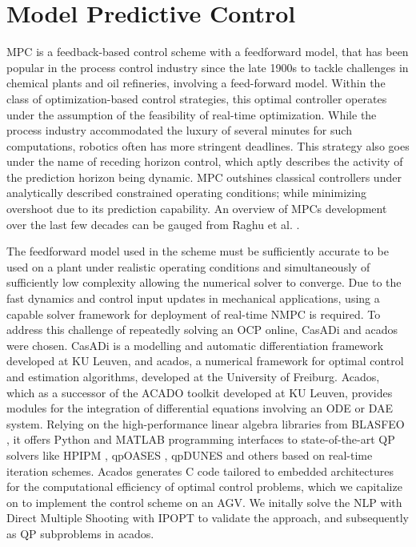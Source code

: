 \section{Model Predictive Control}\label{sec:setup}
\ac{MPC} is a feedback-based control scheme with a feedforward model, that has been popular in the process control industry since the late 1900s to tackle challenges in chemical plants and oil refineries, involving a feed-forward model. Within the class of optimization-based control strategies, this optimal controller operates under the assumption of the feasibility of real-time optimization. While the process industry accommodated the luxury of several minutes for such computations, robotics often has more stringent deadlines. This strategy also goes under the name of receding horizon control, which aptly describes the activity of the prediction horizon being dynamic. MPC outshines classical controllers under analytically described constrained operating conditions; while minimizing overshoot due to its prediction capability. An overview of MPCs development over the last few decades can be gauged from Raghu et al. \cite{raghu_model_2013}.
\par The feedforward model used in the scheme must be sufficiently accurate to be used on a plant under realistic operating conditions and simultaneously of sufficiently low complexity allowing the numerical solver to converge. Due to the fast dynamics and control input updates in mechanical applications, using a capable solver framework for deployment of real-time NMPC is required. To address this challenge of repeatedly solving an \ac{OCP} online, CasADi \cite{andersson_casadi_2019} and acados \cite{verschueren_acados_2020} were chosen. CasADi is a modelling and automatic differentiation framework developed at KU Leuven, and acados, a numerical framework for optimal control and estimation algorithms, developed at the University of Freiburg. Acados, which as a successor of the ACADO toolkit developed at KU Leuven, provides modules for the integration of differential equations involving an \ac{ODE} or \ac{DAE} system. Relying on the high-performance linear algebra libraries from BLASFEO \cite{frison_blasfeo_2018}, it offers Python and MATLAB programming interfaces to state-of-the-art QP solvers like HPIPM \cite{frison_hpipm_2020}, qpOASES \cite{ferreau_qpoases_2014}, qpDUNES \cite{frasch_new_2014} and others based on real-time iteration schemes. Acados generates C code tailored to embedded architectures for the computational efficiency of optimal control problems, which we capitalize on to implement the control scheme on an \ac{AGV}. We initally solve the \ac{NLP} with Direct Multiple Shooting \cite{bock_multiple_1984} with IPOPT \cite{wachter_implementation_2006} to validate the approach, and subsequently as QP subproblems in acados.
